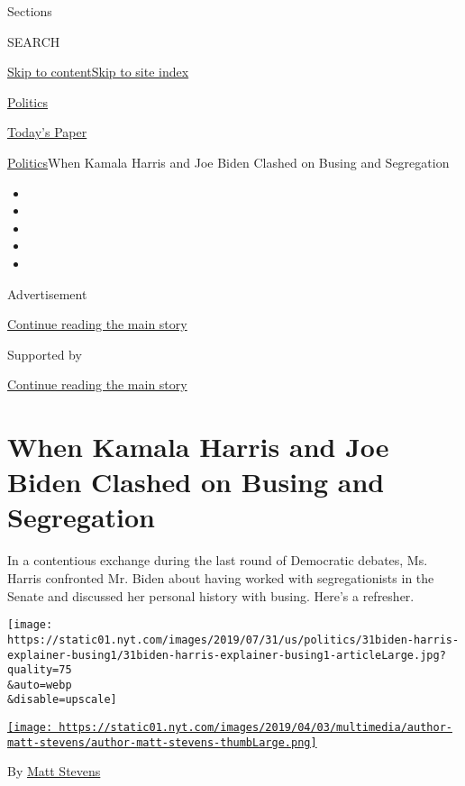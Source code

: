 Sections

SEARCH

\protect\hyperlink{site-content}{Skip to
content}\protect\hyperlink{site-index}{Skip to site index}

\href{https://www.nytimes.com/section/politics}{Politics}

\href{https://myaccount.nytimes.com/auth/login?response_type=cookie\&client_id=vi}{}

\href{https://www.nytimes.com/section/todayspaper}{Today's Paper}

\href{/section/politics}{Politics}\textbar{}When Kamala Harris and Joe
Biden Clashed on Busing and Segregation

\begin{itemize}
\item
\item
\item
\item
\item
\end{itemize}

Advertisement

\protect\hyperlink{after-top}{Continue reading the main story}

Supported by

\protect\hyperlink{after-sponsor}{Continue reading the main story}

\hypertarget{when-kamala-harris-and-joe-biden-clashed-on-busing-and-segregation}{%
\section{When Kamala Harris and Joe Biden Clashed on Busing and
Segregation}\label{when-kamala-harris-and-joe-biden-clashed-on-busing-and-segregation}}

In a contentious exchange during the last round of Democratic debates,
Ms. Harris confronted Mr. Biden about having worked with segregationists
in the Senate and discussed her personal history with busing. Here's a
refresher.

\texttt{[image: https://static01.nyt.com/images/2019/07/31/us/politics/31biden-harris-explainer-busing1/31biden-harris-explainer-busing1-articleLarge.jpg?quality=75\\\&auto=webp\\\&disable=upscale]}

\href{https://www.nytimes.com/by/matt-stevens}{\texttt{[image: https://static01.nyt.com/images/2019/04/03/multimedia/author-matt-stevens/author-matt-stevens-thumbLarge.png]}}

By \href{https://www.nytimes.com/by/matt-stevens}{Matt Stevens}

